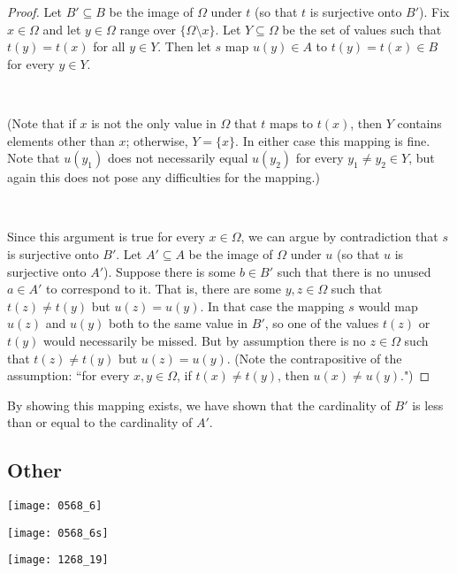 \begin{proof}
Let \(B' \subseteq B\) be the image of \(\Omega\) under \(t\) (so that \(t\) is surjective onto \(B'\)). Fix \(x \in \Omega\) and let \(y \in \Omega\) range over \(\{\Omega \setminus x \}\). Let \(Y \subseteq \Omega\) be the set of values such that \(t(y) = t(x)\) for all \(y \in Y\). Then let \(s\) map \(u(y) \in A\) to \(t(y) = t(x) \in B\) for every \(y \in Y\). 

\

(Note that if \(x\) is not the only value in \(\Omega\) that \(t\) maps to \(t(x)\), then \(Y\) contains elements other than \(x\); otherwise, \(Y = \{x\}\). In either case this mapping is fine. Note that \(u(y_1)\) does not necessarily equal \(u(y_2)\) for every \(y_1 \neq y_2 \in Y\), but again this does not pose any difficulties for the mapping.)
 
 \
 
 Since this argument is true for every \(x \in \Omega\), we can argue by contradiction that \(s\) is surjective onto \(B'\). Let \(A' \subseteq A\) be the image of \(\Omega\) under \(u\) (so that \(u\) is surjective onto \(A'\)). Suppose there is some \(b \in B'\) such that there is no unused \(a \in A'\) to correspond to it. That is, there are some \(y, z \in \Omega\) such that \(t(z) \neq t(y)\) but \(u(z) = u(y)\). In that case the mapping \(s\) would map \(u(z)\) and \(u(y)\) both to the same value in \(B'\), so one of the values \(t(z)\) or \(t(y)\) would necessarily be missed. But by assumption there is no \(z \in \Omega\) such that \(t(z) \neq t(y)\) but \(u(z) = u(y)\). (Note the contrapositive of the assumption: ``for every $x,y\in\Omega$, if \(t(x) \neq t(y)\), then \(u(x) \neq u(y)\).")
 
 \end{proof}
 
 \begin{remark}By showing this mapping exists, we have shown that the cardinality of \(B'\) is less than or equal to the cardinality of \(A'\).

\end{remark}

\subsection{Other}

\texttt{[image: 0568\_6]}

\texttt{[image: 0568\_6s]}

\texttt{[image: 1268\_19]}

